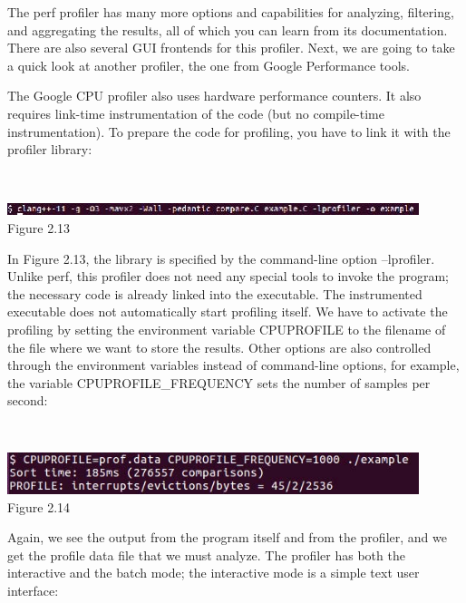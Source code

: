 The perf profiler has many more options and capabilities for analyzing, filtering, and aggregating the results, all of which you can learn from its documentation. There are also several GUI frontends for this profiler. Next, we are going to take a quick look at another profiler, the one from Google Performance tools.


The Google CPU profiler also uses hardware performance counters. It also requires link-time instrumentation of the code (but no compile-time instrumentation). To prepare the code for profiling, you have to link it with the profiler library:

\hspace*{\fill} \\ %
\begin{center}
\includegraphics[width=0.9\textwidth]{content/1/chapter2/images/13.jpg}\\
Figure 2.13
\end{center}

In Figure 2.13, the library is specified by the command-line option –lprofiler. Unlike perf, this profiler does not need any special tools to invoke the program; the necessary code is already linked into the executable. The instrumented executable does not automatically start profiling itself. We have to activate the profiling by setting the environment variable CPUPROFILE to the filename of the file where we want to store the results. Other options are also controlled through the environment variables instead of command-line options, for example, the variable CPUPROFILE\_FREQUENCY sets the number of samples per second:

\hspace*{\fill} \\ %
\begin{center}
\includegraphics[width=0.9\textwidth]{content/1/chapter2/images/14.jpg}\\
Figure 2.14
\end{center}

Again, we see the output from the program itself and from the profiler, and we get the profile data file that we must analyze. The profiler has both the interactive and the batch mode; the interactive mode is a simple text user interface:


